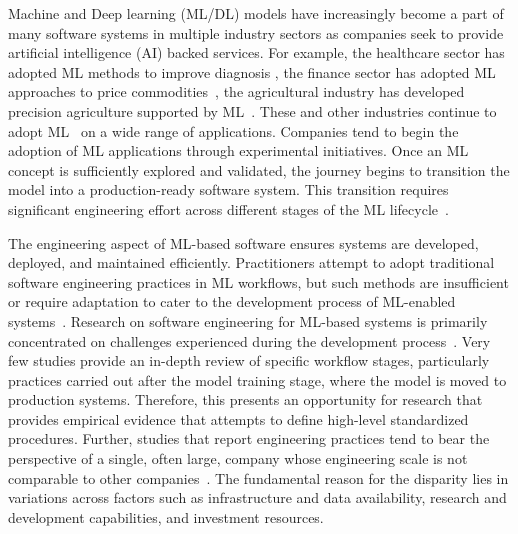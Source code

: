 Machine and Deep learning (ML/DL) models have increasingly become a part of many software systems in multiple industry sectors as companies seek to provide artificial intelligence (AI) backed services. For example, the healthcare sector has adopted ML methods to improve diagnosis \cite{sharma2021systematic}, the finance sector has adopted ML approaches to price commodities~\cite{ghoddusi2019machine}, the agricultural industry has developed precision agriculture supported by ML~\cite{9505674}. These and other industries continue to adopt ML~\cite{jan2022artificial} on a wide range of applications. Companies tend to begin the adoption of ML applications through experimental initiatives. Once an ML concept is sufficiently explored and validated, the journey begins to transition the model into a production-ready software system. This transition requires significant engineering effort across different stages of the ML lifecycle~\cite{8498185, lwakatare2019taxonomy}.

The engineering aspect of ML-based software ensures systems are developed, deployed, and maintained efficiently. Practitioners attempt to adopt traditional software engineering practices in ML workflows, but such methods are insufficient or require adaptation to cater to the development process of ML-enabled systems~\cite{amershi2019software}.  
Research on software engineering for ML-based systems is primarily concentrated on challenges experienced during the development process~\cite{8498185, lwakatare2019taxonomy, giray2021software}. Very few studies provide an in-depth review of specific workflow stages, particularly practices carried out after the model training stage, where the model is moved to production systems. Therefore, this presents an opportunity for research that provides empirical evidence that attempts to define high-level standardized procedures. Further, studies that report engineering practices tend to bear the perspective of a single, often large, company whose engineering scale is not comparable to other companies~\cite{amershi2019software, soifer2019deep, Park}. The fundamental reason for the disparity lies in variations across factors such as infrastructure and data availability, research and development capabilities, and investment resources.


